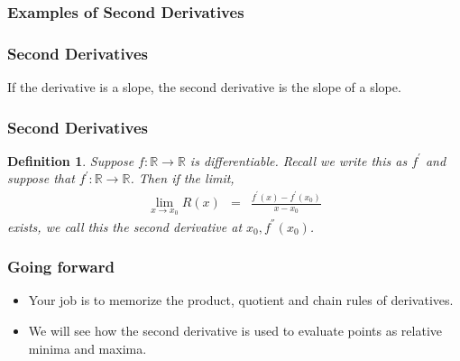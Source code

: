 \documentclass[aspectratio=169, handout]{beamer}
\newtheorem{defn}{Definition}
\numberwithin{equation}{section}
\begin{document}
\begin{frame}
\frametitle{Examples of Second Derivatives}







\end{frame}


\begin{frame}
\frametitle{Second Derivatives}

If the derivative is a slope, the second derivative is the slope of a slope.\pause

\frametitle{Second Derivatives}

\begin{defn} Suppose $f:\mathbb{R} \rightarrow \mathbb{R}$ is differentiable.  Recall we write this as $f^{'}$ and suppose that $f^{'}:\mathbb{R} \rightarrow \mathbb{R}$.  Then if the limit, 
\begin{eqnarray}
\lim_{x\rightarrow x_{0} } R(x) & = & \frac{f^{'}(x) - f^{'}(x_{0} ) } {x - x_{0} } \nonumber 
\end{eqnarray}
exists, we call this the \alert{second derivative} at $x_{0}, f^{''}(x_{0})$.  
\end{defn}

\end{frame}

\begin{frame}
\frametitle{Going forward}
\begin{itemize}
\item Your job is to memorize the product, quotient and chain rules of derivatives.
\item We will see how the second derivative is used to evaluate points as relative minima and maxima.
\end{itemize}
\end{frame}
\end{document}

